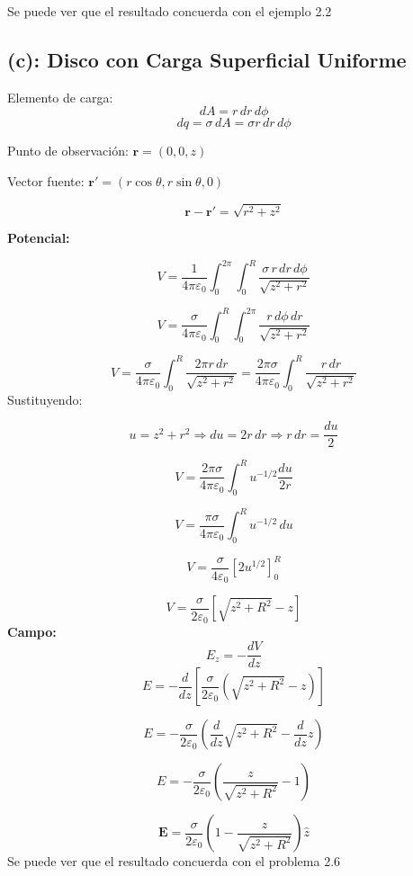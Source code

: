 \documentclass[12pt]{article}
\begin{document}
Se puede ver que el resultado concuerda con el ejemplo 2.2

\subsection*{(c): Disco con Carga Superficial Uniforme}


Elemento de carga:
\[
dA = r\,dr\,d\phi
\]
\[
dq = \sigma \, dA = \sigma  r\,dr\,d\phi
\]

Punto de observación: \(\mathbf{r} = (0, 0, z)\)

Vector fuente: \(\mathbf{r}' = (r \cos\theta, r \sin\theta, 0)\)

\[
{\mathbf{r} - \mathbf{r}'} = \sqrt{r^2 + z^2}
\]

\textbf{Potencial:}

\[
V = \frac{1}{4\pi\varepsilon_0} \int_0^{2\pi} \int_0^R \frac{\sigma\, r\, dr\, d\phi}{\sqrt{z^2 + r^2}}
\]

\[
V = \frac{\sigma}{4\pi\varepsilon_0} \int_0^R \int_0^{2\pi} \frac{r\, d\phi\, dr}{\sqrt{z^2 + r^2}}
\]

\[
V = \frac{\sigma}{4\pi\varepsilon_0} \int_0^R \frac{2\pi r\, dr}{\sqrt{z^2 + r^2}}
= \frac{2\pi\sigma}{4\pi\varepsilon_0} \int_0^R \frac{r\, dr}{\sqrt{z^2 + r^2}}
\]
Sustituyendo:

\[
u = z^2 + r^2 \Rightarrow du = 2r\, dr \Rightarrow r\, dr = \frac{du}{2}
\]

\[
V = \frac{2\pi\sigma}{4\pi\varepsilon_0} \int_0^R u^{-1/2} \frac{du}{2r}
\]

\[
V = \frac{\pi \sigma}{4\pi \varepsilon_0} \int_0^R u^{-1/2} \, du
\]

\[
V = \frac{\sigma}{4\varepsilon_0} \left[ 2u^{1/2} \right]_0^{R}
\]

\[
V = \frac{\sigma}{2\varepsilon_0} \left[ \sqrt{z^2 + R^2} - z \right]
\]
\textbf{Campo:}
\[
E_z = -\frac{dV}{dz}
\]
\[
E = -\frac{d}{dz} \left[ \frac{\sigma}{2\varepsilon_0} \left( \sqrt{z^2 + R^2} - z \right) \right]
\]

\[
E = -\frac{\sigma}{2\varepsilon_0} \left( \frac{d}{dz} \sqrt{z^2 + R^2} - \frac{d}{dz} z \right)
\]

\[
E = -\frac{\sigma}{2\varepsilon_0} \left( \frac{z}{\sqrt{z^2 + R^2}} - 1 \right)
\]

\[
\mathbf{E} = \frac{\sigma}{2\varepsilon_0} \left( 1 - \frac{z}{\sqrt{z^2 + R^2}} \right) \hat{z}
\]
Se puede ver que el resultado concuerda con el problema 2.6

\end{document}
